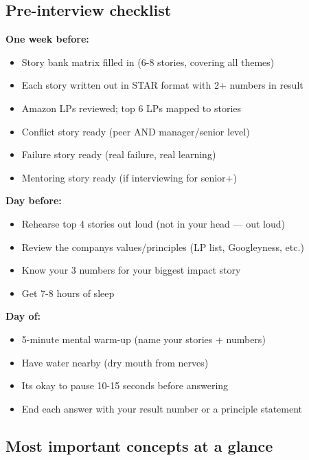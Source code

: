 \documentclass[11pt]{article}
\providecommand{\tightlist}{\setlength{\itemsep}{1pt}\setlength{\parskip}{0pt}}
\begin{document}
\subsection{Pre-interview checklist}\label{pre-interview-checklist}

\textbf{One week before:}

\begin{itemize}
\tightlist
\item[$\square$]
  Story bank matrix filled in (6-8 stories, covering all themes)
\item[$\square$]
  Each story written out in STAR format with 2+ numbers in result
\item[$\square$]
  Amazon LPs reviewed; top 6 LPs mapped to stories
\item[$\square$]
  Conflict story ready (peer AND manager/senior level)
\item[$\square$]
  Failure story ready (real failure, real learning)
\item[$\square$]
  Mentoring story ready (if interviewing for senior+)
\end{itemize}

\textbf{Day before:}

\begin{itemize}
\tightlist
\item[$\square$]
  Rehearse top 4 stories out loud (not in your head --- out loud)
\item[$\square$]
  Review the company\textquotesingle s values/principles (LP list, Googleyness, etc.)
\item[$\square$]
  Know your 3 numbers for your biggest impact story
\item[$\square$]
  Get 7-8 hours of sleep
\end{itemize}

\textbf{Day of:}

\begin{itemize}
\item[$\square$]
  5-minute mental warm-up (name your stories + numbers)
\item[$\square$]
  Have water nearby (dry mouth from nerves)
\item[$\square$]
  It\textquotesingle s okay to pause 10-15 seconds before answering
\item[$\square$]
  End each answer with your result number or a principle statement
\end{itemize}

\subsection{Most important concepts at a glance}\label{most-important-concepts-at-a-glance}
\end{document}
